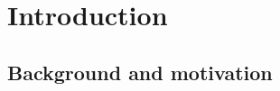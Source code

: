 \documentclass[
  12pt]{article}
\begin{document}
\newpage
{} %


\section{Introduction}
\label{sec:Introduction}

\vspace{-.5em}
\subsection{Background and motivation}
\end{document}
